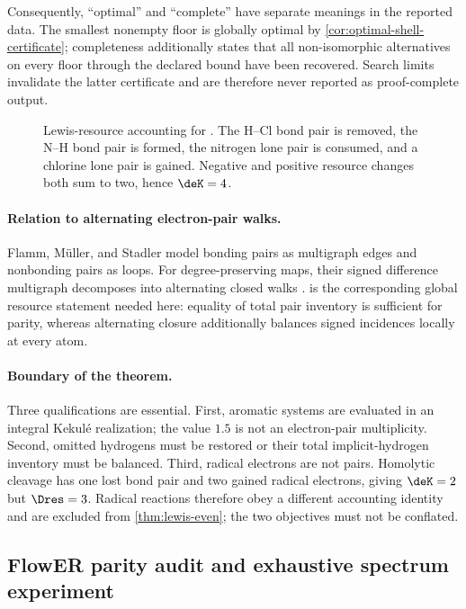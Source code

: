 Consequently, ``optimal'' and ``complete'' have separate meanings in the
reported data.  The smallest nonempty floor is globally optimal by
\cref{cor:optimal-shell-certificate}; completeness additionally states that
all non-isomorphic alternatives on every floor through the declared bound
have been recovered.  Search limits invalidate the latter certificate and
are therefore never reported as proof-complete output.

\begin{figure}[t]
\centering
\resizebox{\linewidth}{!}{}
\caption{Lewis-resource accounting for
.  The H--Cl bond pair is
removed, the N--H bond pair is formed, the nitrogen lone pair is consumed, and
a chlorine lone pair is gained.  Negative and positive resource changes both
sum to two, hence \(\deK=4\).}
\label{fig:lewis-parity}
\end{figure}

\paragraph{Relation to alternating electron-pair walks.}
Flamm, M\"uller, and Stadler model bonding pairs as multigraph edges and
nonbonding pairs as loops.  For degree-preserving maps, their signed
difference multigraph decomposes into alternating closed walks
\citep{flamm2025electronpushing}.   is the corresponding
global resource statement needed here: equality of total pair inventory is
sufficient for parity, whereas alternating closure additionally balances
signed incidences locally at every atom.

\paragraph{Boundary of the theorem.}
Three qualifications are essential.  First, aromatic systems are evaluated
in an integral Kekul\'e realization; the value $1.5$ is not an electron-pair
multiplicity.  Second, omitted hydrogens must be restored or their total
implicit-hydrogen inventory must be balanced.  Third, radical electrons are
not pairs.  Homolytic cleavage has one lost bond pair and two gained radical
electrons, giving \(\deK=2\) but \(\Dres=3\).  Radical reactions therefore
obey a different accounting identity and are excluded from
\cref{thm:lewis-even}; the two objectives must not be conflated.

\subsection{FlowER parity audit and exhaustive spectrum experiment}
\label{sec:lewis-parity-experiment}

